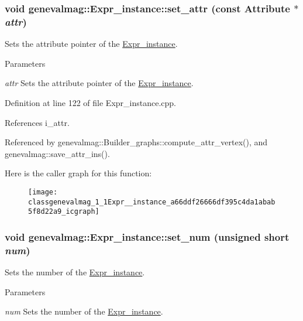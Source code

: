 \hypertarget{classgenevalmag_1_1Expr__instance_a66ddf26666df395c4da1abab5f8d22a9}{
\subsubsection[{set\_\-attr}]{\setlength{\rightskip}{0pt plus 5cm}void genevalmag::Expr\_\-instance::set\_\-attr (const {\bf Attribute} $\ast$ {\em attr})}}
\label{classgenevalmag_1_1Expr__instance_a66ddf26666df395c4da1abab5f8d22a9}
Sets the attribute pointer of the \hyperlink{classgenevalmag_1_1Expr__instance}{Expr\_\-instance}. 
\begin{DoxyParams}{Parameters}
\item[{\em attr}]Sets the attribute pointer of the \hyperlink{classgenevalmag_1_1Expr__instance}{Expr\_\-instance}. \end{DoxyParams}


Definition at line 122 of file Expr\_\-instance.cpp.



References i\_\-attr.



Referenced by genevalmag::Builder\_\-graphs::compute\_\-attr\_\-vertex(), and genevalmag::save\_\-attr\_\-ins().



Here is the caller graph for this function:\nopagebreak
\begin{figure}[H]
\begin{center}
\leavevmode
\texttt{[image: classgenevalmag\_1\_1Expr\_\_instance\_a66ddf26666df395c4da1abab5f8d22a9\_icgraph]}
\end{center}
\end{figure}


\hypertarget{classgenevalmag_1_1Expr__instance_abcd585b490f6fb7ad56de91287853a37}{
\subsubsection[{set\_\-num}]{\setlength{\rightskip}{0pt plus 5cm}void genevalmag::Expr\_\-instance::set\_\-num (unsigned short {\em num})}}
\label{classgenevalmag_1_1Expr__instance_abcd585b490f6fb7ad56de91287853a37}
Sets the number of the \hyperlink{classgenevalmag_1_1Expr__instance}{Expr\_\-instance}. 
\begin{DoxyParams}{Parameters}
\item[{\em num}]Sets the number of the \hyperlink{classgenevalmag_1_1Expr__instance}{Expr\_\-instance}. \end{DoxyParams}


